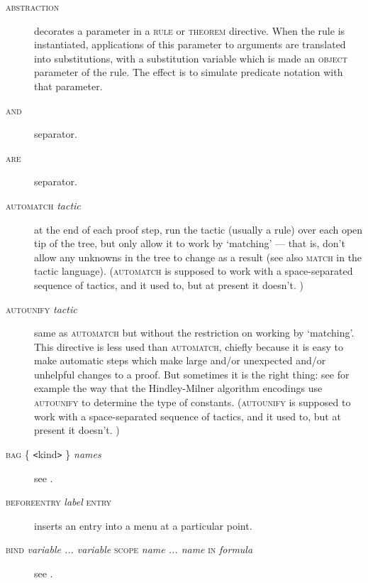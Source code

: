 \begin{description}
\item[\textsc{abstraction}] decorates a parameter in a \textsc{rule} or \textsc{theorem} directive. When the rule is instantiated, applications of this parameter to arguments are translated into substitutions, with a substitution variable which is made an \textsc{object} parameter of the rule. The effect is to simulate predicate notation with that parameter.

\item[\textsc{and}] separator.

\item[\textsc{are}] separator.

\item[\textsc{automatch} %
\textit{tactic}] at the end of each proof step, run the %
tactic (usually a rule) over each open tip of the tree, but only allow %
it to work by `matching' --- that is, don't allow any unknowns in the tree to change as a result (see also \textsc{match} in the tactic language). (\textsc{automatch} is supposed to work with a space-separated sequence of tactics, and it used to, but at present it doesn't. )

\item[\textsc{autounify} %
\textit{tactic}] same as \textsc{automatch} but without the restriction on working by `matching'. This directive is less used than \textsc{automatch}, chiefly because it is easy to make automatic steps which make large and/or unexpected and/or unhelpful changes to a proof. But sometimes it is the right thing: see for example the way that the Hindley-Milner algorithm encodings use \textsc{autounify} to determine the type of constants. (\textsc{autounify} is supposed to work with a space-separated sequence of tactics, and it used to, but at present it doesn't. )

\item[\textsc{bag \{} \texttt{<}kind\texttt{>} \textsc{\}} \textit{names}] see .

\item[\textsc{beforeentry} \textit{label} \textsc{entry}] inserts an entry into a menu at a particular point.

\item[\textsc{bind} \textit{variable ... variable} \textsc{scope} \textit{name ... name} \textsc{in} \textit{formula}] see .


\end{description}
